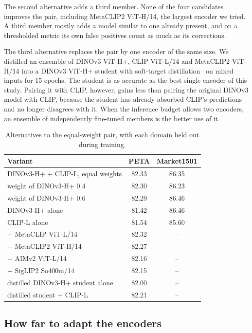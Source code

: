 \documentclass[10pt,twocolumn,letterpaper]{article}
\begin{document}
The second alternative adds a third member. None of the four candidates improves the pair, including MetaCLIP2 ViT-H/14, the largest encoder we tried. A third member mostly adds a model similar to one already present, and on a thresholded metric its own false positives count as much as its corrections.

The third alternative replaces the pair by one encoder of the same size. We distilled an ensemble of DINOv3 ViT-H+, CLIP ViT-L/14 and MetaCLIP2 ViT-H/14 into a DINOv3 ViT-H+ student with soft-target distillation~\cite{hinton} on mixed inputs for 15 epochs. The student is as accurate as the best single encoder of this study. Pairing it with CLIP, however, gains less than pairing the original DINOv3 model with CLIP, because the student has already absorbed CLIP's predictions and no longer disagrees with it. When the inference budget allows two encoders, an ensemble of independently fine-tuned members is the better use of it.

\begin{table}[t]
\centering\small
\setlength{\tabcolsep}{4pt}
\begin{tabular}{@{}lcc@{}}
\toprule
Variant & PETA & Market1501 \\
\midrule
DINOv3-H+ + CLIP-L, equal weights & 82.33 & 86.35 \\
\quad weight of DINOv3-H+ 0.4 & 82.30 & 86.23 \\
\quad weight of DINOv3-H+ 0.6 & 82.29 & 86.46 \\
\quad DINOv3-H+ alone & 81.42 & 86.46 \\
\quad CLIP-L alone & 81.54 & 85.60 \\
\midrule
+ MetaCLIP ViT-L/14 & 82.32 & -- \\
+ MetaCLIP2 ViT-H/14 & 82.27 & -- \\
+ AIMv2 ViT-L/14 & 82.16 & -- \\
+ SigLIP2 So400m/14 & 82.15 & -- \\
\midrule
distilled DINOv3-H+ student alone & 82.00 & -- \\
distilled student + CLIP-L & 82.21 & -- \\
\bottomrule
\end{tabular}
\caption{Alternatives to the equal-weight pair, with each domain held out during training.}
\label{tab:design}
\end{table}

\subsection{How far to adapt the encoders}
\label{sec:depth}
\end{document}
